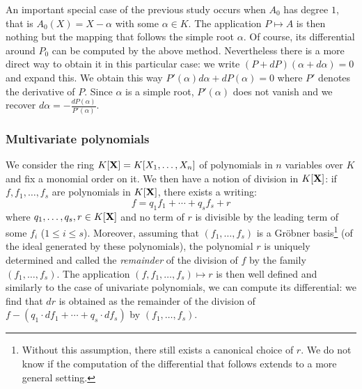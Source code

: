\documentclass{amsart}
\begin{document}
An important special case of the previous study occurs when $A_0$ has 
degree $1$, that is $A_0(X) = X - \alpha$ with some $\alpha \in K$. The 
application $P \mapsto A$ is then nothing but the mapping that follows 
the simple root $\alpha$. Of course, its differential around $P_0$ can 
be computed by the above method. Nevertheless there is a more direct way 
to obtain it in this particular case: we write $(P + dP)(\alpha + 
d\alpha) = 0$ and expand this. We obtain this way $P'(\alpha) d\alpha + 
dP(\alpha) = 0$ where $P'$ denotes the derivative of $P$. Since $\alpha$ 
is a simple root, $P'(\alpha)$ does not vanish and we recover $d \alpha 
= - \frac{dP(\alpha)}{P'(\alpha)}$.

\subsubsection*{Multivariate polynomials}

We consider the ring $K[\mathbf X] = K[X_1, \ldots, X_n]$ of polynomials in $n$
variables over $K$ and fix a monomial order on it. We then have a 
notion of division in $K[\mathbf X]$: if $f, f_1, \ldots, f_s$ are polynomials
in $K[\mathbf X]$, there exists a writing:
$$f = q_1 f_1 + \cdots + q_s f_s + r$$
where $q_1, \ldots, q_s, r \in K[\mathbf X]$ and no term of $r$ is divisible
by the leading term of some $f_i$ ($1 \leq i \leq s$). Moreover, assuming
that $(f_1, \ldots, f_s)$ is a Gr\"obner basis\footnote{Without this
assumption, there still exists a canonical choice of $r$. We do not know
if the computation of the differential that follows extends to a more
general setting.} (of the ideal generated by these polynomials), the 
polynomial $r$ is uniquely determined and called the \emph{remainder} of 
the division of $f$ by the family $(f_1, \ldots, f_s)$. The application 
$(f, f_1, \ldots, f_s) \mapsto r$ is then well defined and similarly to 
the case of univariate polynomials, we can compute its differential: we 
find that $dr$ is obtained as the remainder of the division of $f - (q_1 
\cdot d f_1 + \cdots + q_s \cdot d f_s)$ by $(f_1, \ldots, f_s)$.
\end{document}
